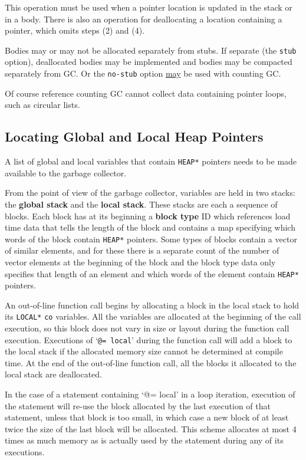 \documentclass[12pt]{article}
\newcommand{\key}[1]{{\rm \bfseries #1}}
\begin{document}
This operation must be used when a pointer location is updated
in the stack or in a body.  There is also an operation for
deallocating a location containing a pointer, which omits steps
(2) and (4).

Bodies may or may not be allocated separately from stubs.
If separate (the {\tt stub} option),
deallocated bodies may be implemented and
bodies may be compacted separately from GC.
Or the {\tt no-stub} option \underline{may} be used with
counting GC.

Of course reference counting GC cannot collect data containing
pointer loops, such as circular lists.

\subsection{Locating Global and Local Heap Pointers}

A list of global and local variables that contain {\tt *HEAP*}
pointers needs to be made available to the garbage collector.

From the point of view of the garbage collector, variables
are held in two stacks: the \key{global stack} and
the \key{local stack}\label{LOCAL-STACK}.  These
stacks are each a sequence of blocks.  Each block has at its
beginning a \key{block type} ID which references load time data that tells
the length of the block and contains a map specifying which words of the block
contain {\tt *HEAP*} pointers.  Some types of blocks contain a vector
of similar elements, and for these there is a separate count of the number of
vector elements at the beginning of the block and the block type data
only specifies that length of an element and
which words of the element contain {\tt *HEAP*} pointers.

An out-of-line function call\label{OUT-OF-LINE-LOCALS}
begins by allocating a block in the
local stack to hold
its {\tt *LOCAL*} {\tt co} variables.  All the variables are allocated
at the beginning of the call execution, so this block does not vary
in size or layout during the function call execution.  Executions
of `{\tt @= local}' during the function call will add a block to the
local stack if the allocated memory size cannot be determined at
compile time.  At the end of the out-of-line function call, all
the blocks it allocated to the local stack are deallocated.

In the case of a statement containing `{@= local}' in a
loop iteration, execution of the statement will re-use the block
allocated by the last execution of that statement, unless that block
is too small, in which case a new block of at least twice the size
of the last block will be allocated.  This scheme allocates at most
4 times as much memory as is actually used by the statement during
any of its executions.
\end{document}
